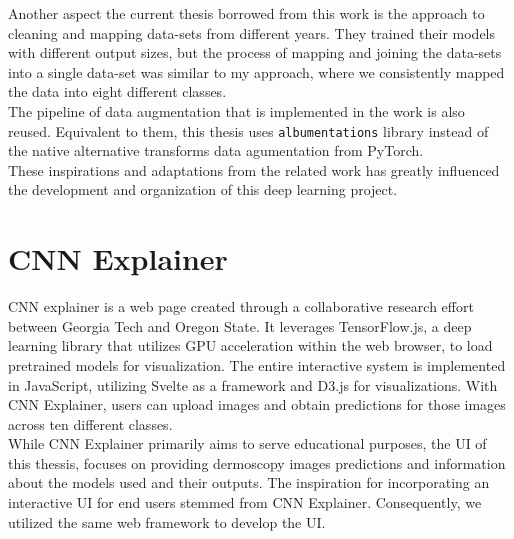 Another aspect the current thesis borrowed from this work is the approach to cleaning and mapping data-sets from different years. They trained their models with different output sizes, but the process of mapping and joining the data-sets into a single data-set was similar to my approach,
where we consistently mapped the data into eight different classes. \\

The pipeline of data augmentation that is implemented in the work is also reused. Equivalent to them,
this thesis uses {\tt albumentations}\cite{Albumentations} library instead of the native alternative transforms data agumentation from PyTorch. \\

These inspirations and adaptations from the related work has greatly influenced the development and organization of this deep learning project.

\section{CNN Explainer}

CNN explainer is a web page created through a collaborative research effort between Georgia Tech and Oregon State\cite{CNNExplainer}. It leverages TensorFlow.js, a deep learning library that utilizes GPU acceleration within the web browser, to load pretrained models for visualization. The entire interactive system is implemented in JavaScript, utilizing Svelte as a framework and D3.js for visualizations. With CNN Explainer, users can upload images and obtain predictions for those images across ten different classes. \\

While CNN Explainer primarily aims to serve educational purposes,
the UI of this thessis, focuses on providing dermoscopy images predictions and information about the models used and their outputs. The inspiration for incorporating an interactive UI for end users stemmed from CNN Explainer.
Consequently, we utilized the same web framework to develop the UI.
